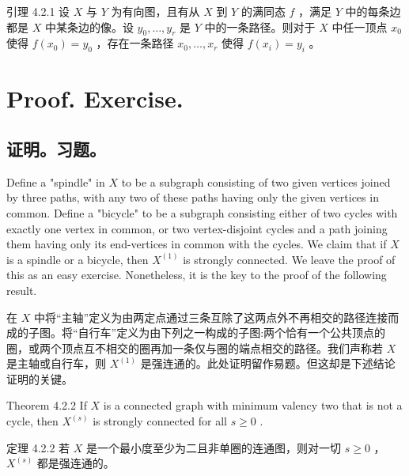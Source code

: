 \documentclass[10pt]{article}
\begin{document}
\begin{tcolorbox}\relax
引理 4.2.1 设 \(X\) 与 \(Y\) 为有向图，且有从 \(X\) 到 \(Y\) 的满同态 \(f\) ，满足 \(Y\) 中的每条边都是 \(X\) 中某条边的像。设 \({y}_{0},\ldots ,{y}_{r}\) 是 \(Y\) 中的一条路径。则对于 \(X\) 中任一顶点 \({x}_{0}\) 使得 \(f\left( {x}_{0}\right)  = {y}_{0}\) ，存在一条路径 \({x}_{0},\ldots ,{x}_{r}\) 使得 \(f\left( {x}_{i}\right)  = {y}_{i}\) 。
\end{tcolorbox}

\section*{Proof. Exercise.}

\begin{tcolorbox}\relax
\section*{证明。习题。}
\end{tcolorbox}

Define a "spindle" in \(X\) to be a subgraph consisting of two given vertices joined by three paths, with any two of these paths having only the given vertices in common. Define a "bicycle" to be a subgraph consisting either of two cycles with exactly one vertex in common, or two vertex-disjoint cycles and a path joining them having only its end-vertices in common with the cycles. We claim that if \(X\) is a spindle or a bicycle, then \({X}^{\left( 1\right) }\) is strongly connected. We leave the proof of this as an easy exercise. Nonetheless, it is the key to the proof of the following result.

\begin{tcolorbox}\relax
在 \(X\) 中将“主轴”定义为由两定点通过三条互除了这两点外不再相交的路径连接而成的子图。将“自行车”定义为由下列之一构成的子图:两个恰有一个公共顶点的圈，或两个顶点互不相交的圈再加一条仅与圈的端点相交的路径。我们声称若 \(X\) 是主轴或自行车，则 \({X}^{\left( 1\right) }\) 是强连通的。此处证明留作易题。但这却是下述结论证明的关键。
\end{tcolorbox}

Theorem 4.2.2 If \(X\) is a connected graph with minimum valency two that is not a cycle, then \({X}^{\left( s\right) }\) is strongly connected for all \(s \geq  0\) .

\begin{tcolorbox}\relax
定理 4.2.2 若 \(X\) 是一个最小度至少为二且非单圈的连通图，则对一切 \(s \geq  0\) ， \({X}^{\left( s\right) }\) 都是强连通的。
\end{tcolorbox}
\end{document}
